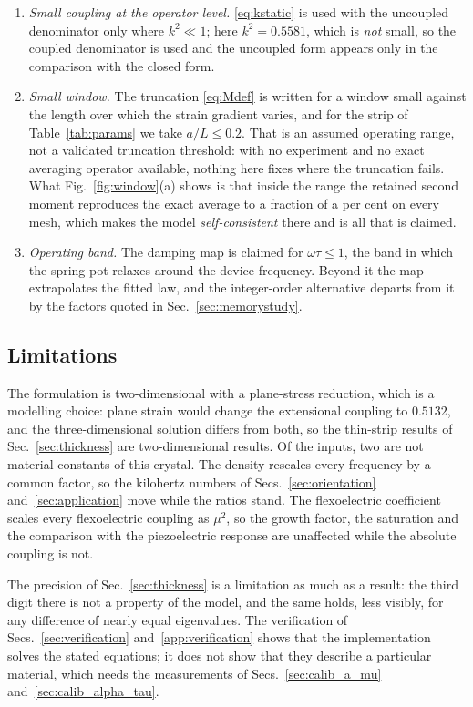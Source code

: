 \begin{enumerate}
\item \emph{Small coupling at the operator level.} \eqref{eq:kstatic} is used
  with the uncoupled denominator only where $k^{2}\ll1$; here
  $k^{2}=0.5581$, which is \emph{not} small, so the coupled denominator is used
  and the uncoupled form appears only in the comparison with the closed form.
\item \emph{Small window.} The truncation \eqref{eq:Mdef} is written for a
  window small against the length over which the strain gradient varies, and
  for the strip of Table~\ref{tab:params} we take $a/L\le0.2$. That is an
  assumed operating range, not a validated truncation threshold: with no
  experiment and no exact averaging operator available, nothing here fixes
  where the truncation fails. What Fig.~\ref{fig:window}(a) shows is that
  inside the range the retained second moment reproduces the exact average to
  a fraction of a per cent on every mesh, which makes the model
  \emph{self-consistent} there and is all that is claimed.
\item \emph{Operating band.} The damping map is claimed for $\omega\tau\le1$,
  the band in which the spring-pot relaxes around the device frequency. Beyond
  it the map extrapolates the fitted law, and the integer-order alternative
  departs from it by the factors quoted in Sec.~\ref{sec:memorystudy}.
\end{enumerate}

\FloatBarrier
\subsection{Limitations}
\label{sec:limitations}

The formulation is two-dimensional with a plane-stress reduction, which is a
modelling choice: plane strain would change the extensional coupling to
$0.5132$, and the three-dimensional solution differs from both, so the
thin-strip results of Sec.~\ref{sec:thickness} are two-dimensional results. Of
the inputs, two are not material constants of this crystal. The density
rescales every frequency by a common factor, so the kilohertz numbers of
Secs.~\ref{sec:orientation} and~\ref{sec:application} move while the ratios
stand. The flexoelectric coefficient scales every flexoelectric coupling as
$\mu^{2}$, so the growth factor, the saturation and the comparison with the
piezoelectric response are unaffected while the absolute coupling is not.

The precision of Sec.~\ref{sec:thickness} is a limitation as much as a result:
the third digit there is not a property of the model, and the same holds, less
visibly, for any difference of nearly equal eigenvalues.
The verification of Secs.~\ref{sec:verification}
and~\ref{app:verification} shows that the implementation solves the stated
equations; it does not show that they describe a particular material, which
needs the measurements of Secs.~\ref{sec:calib_a_mu}
and~\ref{sec:calib_alpha_tau}.

\FloatBarrier
